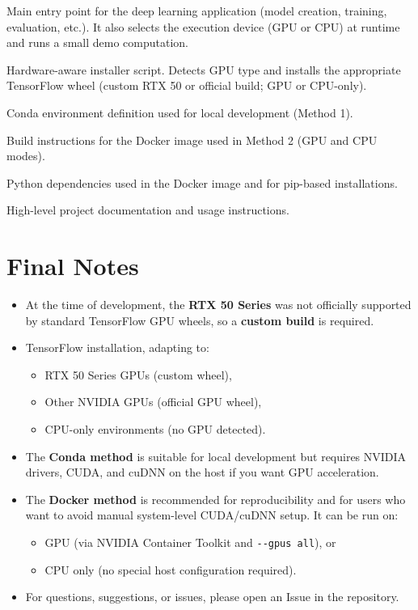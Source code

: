 \documentclass[a4paper,11pt]{article}
\begin{document}
\begin{description}[style=multiline, leftmargin=4cm, font=\bfseries]
    \item[main.py] Main entry point for the deep learning application (model creation, training, evaluation, etc.). It also selects the execution device (GPU or CPU) at runtime and runs a small demo computation.
    \item[install\_tf.py] Hardware-aware installer script. Detects GPU type and installs the appropriate TensorFlow wheel (custom RTX 50 or official build; GPU or CPU-only).
    \item[environment.yml] Conda environment definition used for local development (Method 1).
    \item[Dockerfile] Build instructions for the Docker image used in Method 2 (GPU and CPU modes).
    \item[requirements.txt] Python dependencies used in the Docker image and for pip-based installations.
    \item[README.md] High-level project documentation and usage instructions.
\end{description}

\section{Final Notes}

\begin{itemize}
    \item At the time of development, the \textbf{RTX 50 Series} was not officially supported by standard TensorFlow GPU wheels, so a \textbf{custom build} is required.
    \item  TensorFlow installation, adapting to:
    \begin{itemize}
        \item RTX 50 Series GPUs (custom wheel),
        \item Other NVIDIA GPUs (official GPU wheel),
        \item CPU-only environments (no GPU detected).
    \end{itemize}
    \item The \textbf{Conda method} is suitable for local development but requires NVIDIA drivers, CUDA, and cuDNN on the host if you want GPU acceleration.
    \item The \textbf{Docker method} is recommended for reproducibility and for users who want to avoid manual system-level CUDA/cuDNN setup. It can be run on:
    \begin{itemize}
        \item GPU (via NVIDIA Container Toolkit and \verb|--gpus all|), or
        \item CPU only (no special host configuration required).
    \end{itemize}
    \item For questions, suggestions, or issues, please open an Issue in the repository.
\end{itemize}
\end{document}
